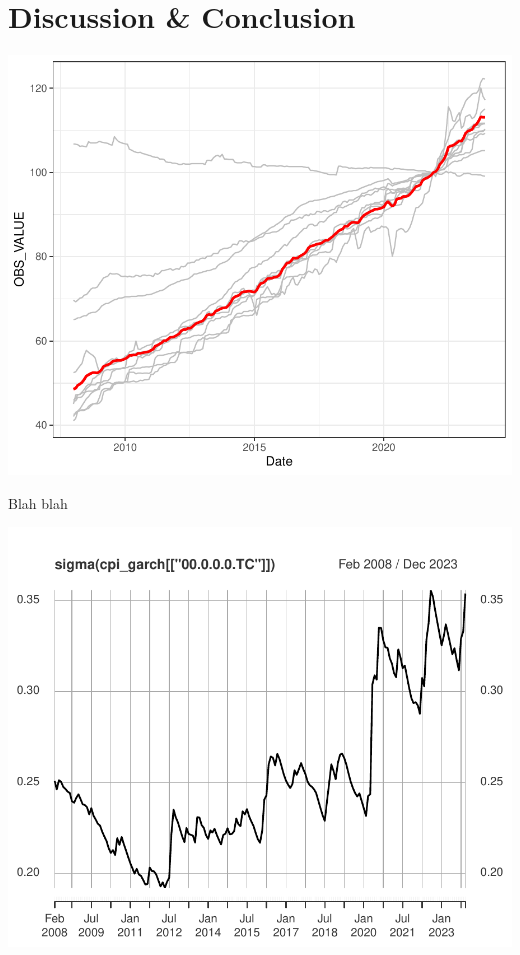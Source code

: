 \documentclass[11pt,preprint, authoryear]{elsarticle}
\numberwithin{equation}{section}
\numberwithin{figure}{section}
\numberwithin{table}{section}
\begin{document}
\hypertarget{discussion-conclusion}{%
\section{Discussion \& Conclusion}\label{discussion-conclusion}}

\includegraphics{FMX-Proj-Write_Up_files/figure-latex/unnamed-chunk-3-1.pdf}

Blah blah

\includegraphics{FMX-Proj-Write_Up_files/figure-latex/model_garch-1.pdf}
\end{document}
